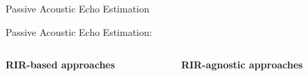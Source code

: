 \begin{frame}{Passive Acoustic Echo Estimation}

    \begin{block}{\alert{Passive} Acoustic Echo Estimation:}
        \small

        \pause
        \vspace{.5em}
        \begin{columns}[T,onlytextwidth] %
            \begin{column}{.48\textwidth}
                \textbf{RIR-\alert{based} approaches}
            \end{column}
            \begin{column}{.48\textwidth}
                \textbf{RIR-\alert{agnostic} approaches}
            \end{column}%
        \end{columns}


\end{block}
\end{frame}
